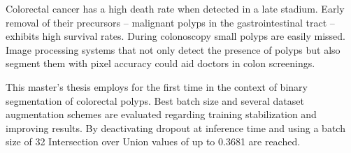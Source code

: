 Colorectal cancer has a high death rate when detected in a late stadium.
Early removal of their precursors -- malignant polyps in the gastrointestinal tract -- exhibits high survival rates.
During colonoscopy small polyps are easily missed.
Image processing systems that not only detect the presence of polyps but also segment them with pixel accuracy could aid doctors in colon screenings.

This master's thesis employs  for the first time in the context of binary segmentation of colorectal polyps.
Best batch size and several dataset augmentation schemes are evaluated regarding training stabilization and improving results.
By deactivating dropout at inference time and using a batch size of 32 Intersection over Union values of up to 0.3681 are reached.

